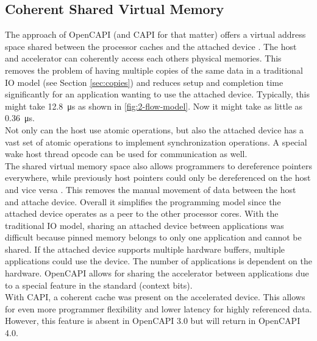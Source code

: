 \subsection{Coherent Shared Virtual Memory}
The approach of OpenCAPI (and CAPI for that matter) offers a virtual address space shared between the processor caches and the attached device \cite{opencapi-jeff-preso}. The host and accelerator can coherently access each others physical memories. This removes the problem of having multiple copies of the same data in a traditional IO model (see Section \ref{sec:copies}) and reduces setup and completion time significantly for an application wanting to use the attached device. Typically, this might take \SI{12.8}{\micro\second} as shown in \autoref{fig:2-flow-model}. Now it might take as little as \SI{0.36}{\micro\second}.\\
Not only can the host use atomic operations, but also the attached device has a vast set of atomic operations to implement synchronization operations. A special wake host thread opcode can be used for communication as well.\\
The shared virtual memory space also allows programmers to dereference pointers everywhere, while previously host pointers could only be dereferenced on the host and vice versa \cite{benton}. This removes the manual movement of data between the host and attache device. Overall it simplifies the programming model since the attached device operates as a peer to the other processor cores. With the traditional IO model, sharing an attached device between applications was difficult because pinned memory belongs to only one application and cannot be shared. If the attached device supports multiple hardware buffers, multiple applications could use the device. The number of applications is dependent on the hardware. OpenCAPI allows for sharing the accelerator between applications due to a special feature in the standard (context bits).\\
With CAPI, a coherent cache was present on the accelerated device. This allows for even more programmer flexibility and lower latency for highly referenced data. However, this feature is absent in OpenCAPI 3.0 but will return in OpenCAPI 4.0.


